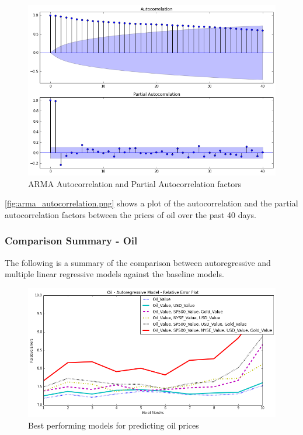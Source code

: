 \documentclass[runningheads]{llncs}
\begin{document}
\begin{center}
\begin{figure}
\centering
\includegraphics[width=\textwidth]{arma_autocorrelation.png}
\caption{ARMA Autocorrelation and Partial Autocorrelation factors}
\label{fig:arma_autocorrelation.png}
\end{figure}
\end{center}

\noindent \autoref{fig:arma_autocorrelation.png} shows a plot of the autocorrelation and the partial autocorrelation factors between the prices of oil over the past 40 days. \\

\newpage
\subsubsection {Comparison Summary - Oil} The following is a summary of the comparison between autoregressive and multiple linear regressive models against the baseline models. \\

\begin{figure}
\centering
\includegraphics[width=\textwidth]{oil_autoregressive_bestModels.png}
\caption{Best performing models for predicting oil prices}
\label{fig:oil_autoregressive_bestModels.png}
\end{figure}
\end{document}
